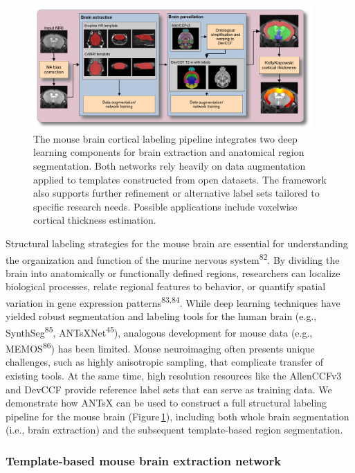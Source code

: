 \documentclass[
  12pt,
]{article}
\begin{document}
\begin{figure}
\centering
\includegraphics[width=0.95\textwidth]{Figures/mousePipeline.pdf} \caption{The
mouse brain cortical labeling pipeline integrates two deep learning components
for brain extraction and anatomical region segmentation. Both networks rely
heavily on data augmentation applied to templates constructed from open
datasets. The framework also supports further refinement or alternative label
sets tailored to specific research needs. Possible applications include
voxelwise cortical thickness estimation.}
\label{fig:mouseKK}
\end{figure}

Structural labeling strategies for the mouse brain are essential for
understanding the organization and function of the murine nervous
system\textsuperscript{82}. By dividing the brain into anatomically or
functionally defined regions, researchers can localize biological
processes, relate regional features to behavior, or quantify spatial
variation in gene expression patterns\textsuperscript{83,84}. While deep
learning techniques have yielded robust segmentation and labeling tools
for the human brain (e.g., SynthSeg\textsuperscript{85},
ANTsXNet\textsuperscript{45}), analogous development for mouse data
(e.g., MEMOS\textsuperscript{86}) has been limited. Mouse neuroimaging
often presents unique challenges, such as highly anisotropic sampling,
that complicate transfer of existing tools. At the same time, high
resolution resources like the AllenCCFv3 and DevCCF provide reference
label sets that can serve as training data. We demonstrate how ANTsX can
be used to construct a full structural labeling pipeline for the mouse
brain (Figure\,\ref{fig:mouseKK}), including both whole brain
segmentation (i.e., brain extraction) and the subsequent template-based
region segmentation.

\subsubsection{Template-based mouse brain extraction
network}\label{template-based-mouse-brain-extraction-network}
\end{document}
